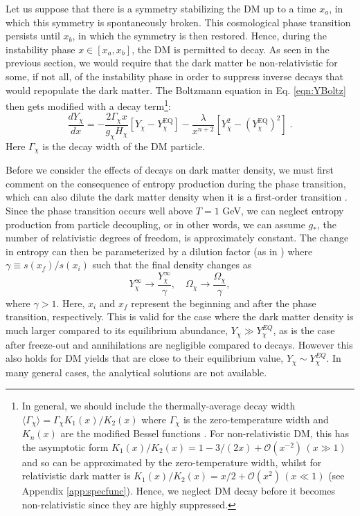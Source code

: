 Let us suppose that there is a symmetry stabilizing the DM up to a time $x_a$, in which this symmetry is spontaneously broken. This cosmological phase transition persists until $x_b$, in which the symmetry is then restored. Hence, during the instability phase $x \in [x_a , x_b]$, the DM is permitted to decay. As seen in the previous section, we would require that the dark matter be non-relativistic for some, if not all, of the instability phase in order to suppress inverse decays that would repopulate the dark matter. The Boltzmann equation in Eq. \ref{eqn:YBoltz} then gets modified with a decay term\footnote{In general, we should include the thermally-average decay width $\langle \Gamma_{\chi} \rangle= \Gamma_{\chi}K_1 (x)/K_2 (x)$ where $\Gamma_{\chi}$ is the zero-temperature width and $K_n(x)$ are the modified Bessel functions \cite{RN782,RN784,RN783}. For non-relativistic DM, this has the asymptotic form $K_1(x)/K_2(x)=1-3/(2x)+\mathcal{O}(x^{-2})\, (x \gg 1)$ and so can be approximated by the zero-temperature width, whilst for relativistic dark matter is $K_1(x)/K_2(x)=x/2+\mathcal{O}(x^2)\, (x \ll 1)$ (see Appendix \ref{app:specfunc}). Hence, we neglect DM decay before it becomes non-relativistic since they are highly suppressed.}:
\begin{equation}
	\frac{dY_{\chi}}{dx}=-\frac{2\Gamma_{\chi}x}{g_{\chi}H_{\chi}}\left[Y_{\chi}-Y_{\chi}^{\text{EQ}}\right]-\frac{\lambda}{x^{n+2}}\left[Y_{\chi}^2-\left(Y_{\chi}^{\text{EQ}}\right)^2\right]\;.
    \label{eqn:YBoltzDecay}
\end{equation} 
Here $\Gamma_{\chi}$ is the decay width of the DM particle.

Before we consider the effects of decays on dark matter density, we must first comment on the consequence of entropy production during the phase transition, which can also dilute the dark matter density when it is a first-order transition \cite{RN787,RN786}. Since the phase transition occurs well above $T=1$ GeV, we can neglect entropy production from particle decoupling, or in other words, we can assume $g_*$, the number of relativistic degrees of freedom, is approximately constant. The change in entropy can then be parameterized by a dilution factor (as in \cite{RN787}) where $\gamma \equiv s(x_f)/s(x_i)$ such that the final density changes as
\begin{equation}
	Y^{\infty}_{\chi} \rightarrow \frac{Y^{\infty}_{\chi}}{\gamma}, \quad \Omega_{\chi} \rightarrow \frac{\Omega_{\chi}}{\gamma},
\end{equation}
where $\gamma > 1$. Here, $x_i$ and $x_f$ represent the beginning and after the phase transition, respectively. This is valid for the case where the dark matter density is much larger compared to its equilibrium abundance, $Y_{\chi} \gg Y^{EQ}_{\chi}$, as is the case after freeze-out and annihilations are negligible compared to decays. However this also holds for DM yields that are close to their equilibrium value, $Y_{\chi} \sim Y^{EQ}_{\chi}$. In many general cases, the analytical solutions are not available.

